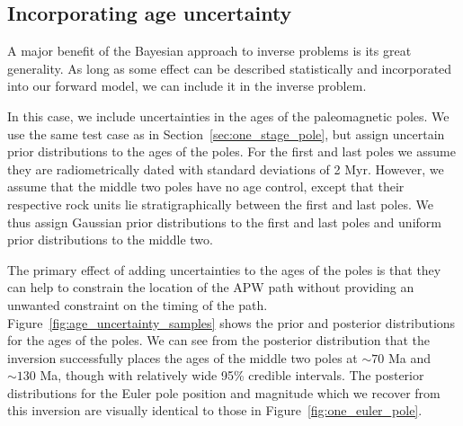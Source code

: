 \documentclass[preprint,12pt,authoryear]{elsarticle}
\begin{document}
\subsection{Incorporating age uncertainty}
\label{sec:age_uncertainty}
A major benefit of the Bayesian approach to inverse problems is its great generality.
As long as some effect can be described statistically and incorporated into our
forward model, we can include it in the inverse problem.

In this case, we include uncertainties in the ages of the paleomagnetic poles.
We use the same test case as in Section~\ref{sec:one_stage_pole}, but assign uncertain prior
distributions to the ages of the poles. For the first and last poles we assume they
are radiometrically dated with standard deviations of 2 Myr.
However, we assume that the middle two poles have no age control, except that their
respective rock units lie stratigraphically between the first and last poles.
We thus assign Gaussian prior distributions to the first and last poles and uniform prior distributions
to the middle two.

The primary effect of adding uncertainties to the ages of the poles is that they can
help to constrain the location of the APW path without providing an unwanted constraint
on the timing of the path.
Figure~\ref{fig:age_uncertainty_samples} shows the prior and posterior distributions for the
ages of the poles. We can see from the posterior distribution that the inversion
successfully places the ages of the middle two poles at $\sim70$ Ma and $\sim130$ Ma,
though with relatively wide 95\% credible intervals.
The posterior distributions for the Euler pole position and magnitude 
which we recover from this inversion are visually identical to those in Figure~\ref{fig:one_euler_pole}.
\end{document}
